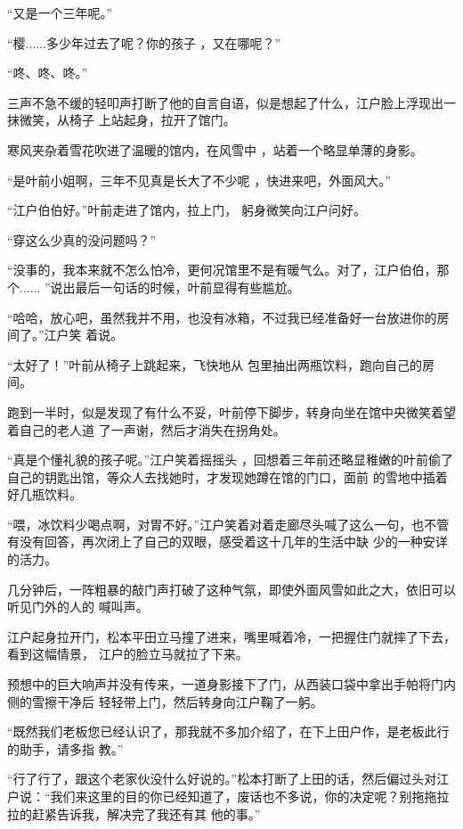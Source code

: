 \documentclass{article}
\begin{document}
“又是一个三年呢。” 

“樱......多少年过去了呢？你的孩子
，又在哪呢？” 


“咚、咚、咚。” 

三声不急不缓的轻叩声打断了他的自言自语，似是想起了什么，江户脸上浮现出一抹微笑，从椅子
上站起身，拉开了馆门。 

寒风夹杂着雪花吹进了温暖的馆内，在风雪中
，站着一个略显单薄的身影。 

“是叶前小姐啊，三年不见真是长大了不少呢
，快进来吧，外面风大。” 

\newpage

“江户伯伯好。”叶前走进了馆内，拉上门，
躬身微笑向江户问好。 


“穿这么少真的没问题吗？” 

“没事的，我本来就不怎么怕冷，更何况馆里不是有暖气么。对了，江户伯伯，那个......
”说出最后一句话的时候，叶前显得有些尴尬。 

“哈哈，放心吧，虽然我并不用，也没有冰箱，不过我已经准备好一台放进你的房间了。”江户笑
着说。 

“太好了！”叶前从椅子上跳起来，飞快地从
包里抽出两瓶饮料，跑向自己的房间。 

跑到一半时，似是发现了有什么不妥，叶前停下脚步，转身向坐在馆中央微笑着望着自己的老人道
了一声谢，然后才消失在拐角处。 

“真是个懂礼貌的孩子呢。”江户笑着摇摇头
\newpage
，回想着三年前还略显稚嫩的叶前偷了自己的钥匙出馆，等众人去找她时，才发现她蹲在馆的门口，面前
的雪地中插着好几瓶饮料。 

“喂，冰饮料少喝点啊，对胃不好。”江户笑着对着走廊尽头喊了这么一句，也不管有没有回答，再次闭上了自己的双眼，感受着这十几年的生活中缺
少的一种安详的活力。 

几分钟后，一阵粗暴的敲门声打破了这种气氛，即使外面风雪如此之大，依旧可以听见门外的人的
喊叫声。 

江户起身拉开门，松本平田立马撞了进来，嘴里喊着冷，一把握住门就摔了下去，看到这幅情景，
江户的脸立马就拉了下来。 

预想中的巨大响声并没有传来，一道身影接下了门，从西装口袋中拿出手帕将门内侧的雪擦干净后
轻轻带上门，然后转身向江户鞠了一躬。 

\newpage

“既然我们老板您已经认识了，那我就不多加介绍了，在下上田户作，是老板此行的助手，请多指
教。” 

“行了行了，跟这个老家伙没什么好说的。”松本打断了上田的话，然后偏过头对江户说：“我们来这里的目的你已经知道了，废话也不多说，你的决定呢？别拖拖拉拉的赶紧告诉我，解决完了我还有其
他的事。” 
\end{document}
